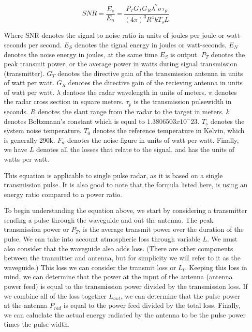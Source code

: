 \documentclass[12pt]{article}
\begin{document}
\begin{equation}
    SNR = \frac{E_s}{E_n} =  \frac{P_T G_T G_R \lambda^2 \sigma \tau_p }{(4\pi)^3 R^4 k T_s L}
\end{equation}

Where SNR denotes the signal to noise ratio in units of joules per joule or watt-seconds per second. $E_S$ denotes the signal energy in joules or watt-seconds. $E_N$ denotes the noise energy in joules, at the same time $E_S$  is output. $P_T$ denotes the peak transmit power, or the average power in watts during signal transmission (transmitter). $G_T$ denotes the directive gain of the transmission antenna in units of watt per watt. $G_R$ denotes the directive gain of the recieving antenna in units of watt per watt. $\lambda$ dentoes the radar wavelength in units of meters. $\pi$ denotes the radar cross section in square meters. $\tau_p$ is the transmission pulsewidth in seconds. $R$ denotes the slant range from the radar to the target in meters. $k$ denotes Boltzmann's constant which is equal to $1.3806503x10^-23$. $T_s$ denotes the system noise temperature. $T_0$ denotes the reference temperature in Kelvin, which is generally 290k. $F_n$ denotes the noise figure in units of watt per watt. Finally, we have $L$ denotes all the losses that relate to the signal, and has the units of watts per watt. 

This equation is applicable to single pulse radar, as it is based on a single transmission pulse. It is also good to note that the formula listed here, is using an energy ratio compared to a power ratio. 

To begin understanding the equation above, we start by considering a transmitter sending a pulse through the waveguide and out the antenna. The peak transmission power or $P_T$, is the average transmit power over the duration of the pulse. We can take into account atmospheric loss through variable $L$. We must also consider that the waveguide also adds loss. (There are other components between the tranmitter and antenna, but for simplicity we will refer to it as the waveguide.) This loss we can consider the transmit loss or $L_t$. Keeping this loss in mind, we can determine that the power at the input of the antenna (antenna power feed) is equal to the transmission power divided by the transmission loss. If we combine all of the loss together $L_{ant}$, we can determine that the pulse power at the antenna $P_{rad}$ is equal to the power feed divided by the total loss. Finally, we can caluclate the actual energy radiated by the antenna to be the pulse power times the pulse width. 
\end{document}
